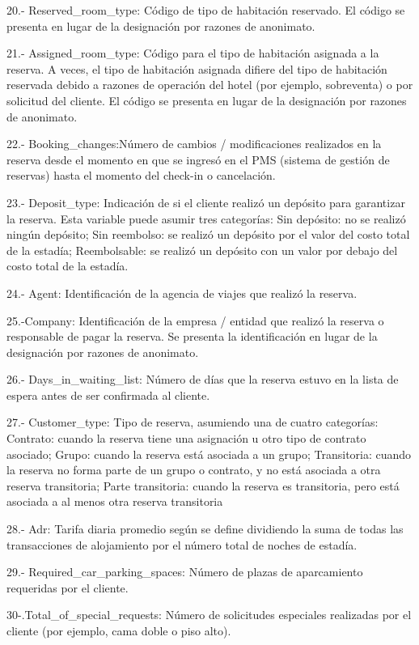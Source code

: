 \documentclass[]{article}
\begin{document}
20.- Reserved\_room\_type: Código de tipo de habitación reservado. El
código se presenta en lugar de la designación por razones de anonimato.

21.- Assigned\_room\_type: Código para el tipo de habitación asignada a
la reserva. A veces, el tipo de habitación asignada difiere del tipo de
habitación reservada debido a razones de operación del hotel (por
ejemplo, sobreventa) o por solicitud del cliente. El código se presenta
en lugar de la designación por razones de anonimato.

22.- Booking\_changes:Número de cambios / modificaciones realizados en
la reserva desde el momento en que se ingresó en el PMS (sistema de
gestión de reservas) hasta el momento del check-in o cancelación.

23.- Deposit\_type: Indicación de si el cliente realizó un depósito para
garantizar la reserva. Esta variable puede asumir tres categorías: Sin
depósito: no se realizó ningún depósito; Sin reembolso: se realizó un
depósito por el valor del costo total de la estadía; Reembolsable: se
realizó un depósito con un valor por debajo del costo total de la
estadía.

24.- Agent: Identificación de la agencia de viajes que realizó la
reserva.

25.-Company: Identificación de la empresa / entidad que realizó la
reserva o responsable de pagar la reserva. Se presenta la identificación
en lugar de la designación por razones de anonimato.

26.- Days\_in\_waiting\_list: Número de días que la reserva estuvo en la
lista de espera antes de ser confirmada al cliente.

27.- Customer\_type: Tipo de reserva, asumiendo una de cuatro
categorías: Contrato: cuando la reserva tiene una asignación u otro tipo
de contrato asociado; Grupo: cuando la reserva está asociada a un grupo;
Transitoria: cuando la reserva no forma parte de un grupo o contrato, y
no está asociada a otra reserva transitoria; Parte transitoria: cuando
la reserva es transitoria, pero está asociada a al menos otra reserva
transitoria

28.- Adr: Tarifa diaria promedio según se define dividiendo la suma de
todas las transacciones de alojamiento por el número total de noches de
estadía.

29.- Required\_car\_parking\_spaces: Número de plazas de aparcamiento
requeridas por el cliente.

30-.Total\_of\_special\_requests: Número de solicitudes especiales
realizadas por el cliente (por ejemplo, cama doble o piso alto).
\end{document}
